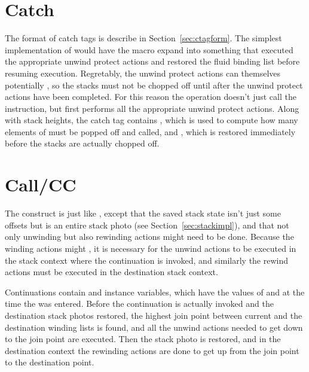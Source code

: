 \section{Catch} \label{sec:oakcatch}

The format of catch tags is describe in Section~\ref{sec:ctagform}.
The simplest implementation of  would have the
 macro expand into something that executed the
appropriate unwind protect actions and restored the fluid binding list
before resuming execution.  Regretably, the unwind protect actions can
themselves potentially , so the stacks must not be chopped
off until after the unwind protect actions have been completed.  For
this reason the  operation doesn't just call the 
instruction, but first performs all the appropriate unwind protect
actions.  Along with stack heights, the catch tag contains
, which is used to compute how many elements of
 must be popped off and called, and
, which is restored immediately before
the stacks are actually chopped off.


\section{Call/CC}

The  construct is just like , except that
the saved stack state isn't just some offsets but is an entire stack
photo (see Section~\ref{sec:stackimpl}), and that not only unwinding
but also rewinding actions might need to be done.  Because the winding
actions might , it is necessary for the unwind actions to be
executed in the stack context where the continuation is invoked, and
similarly the rewind actions must be executed in the destination stack
context.


Continuations contain  and 
instance variables, which have the values of  and
 at the time the  was entered.  Before
the continuation is actually invoked and the destination stack photos
restored, the highest join point between current and the destination
winding lists is found, and all the unwind actions needed to get down
to the join point are executed.  Then the stack photo is restored, and
in the destination context the rewinding actions are done to get up
from the join point to the destination point.


